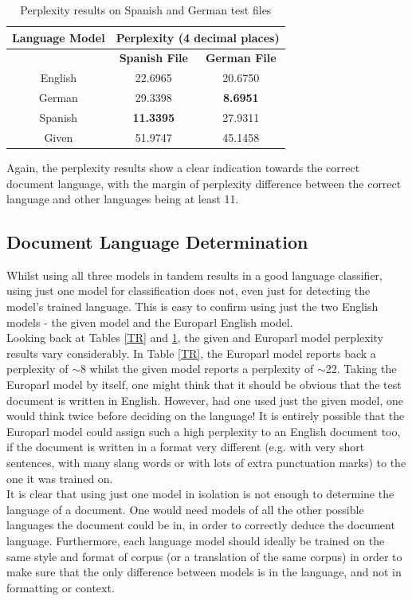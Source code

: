 \documentclass[12pt]{article}
\begin{document}
\begin{table}[H]
	\centering
	\setlength\arrayrulewidth{1pt}
	\caption{\label{SR}Perplexity results on Spanish and German test files }
	\begin{tabular}{c c c}
		\hline
		\textbf{Language Model} & \multicolumn{2}{c}{\textbf{Perplexity (4 decimal places)} }\\
		\hline
		  & \textbf{Spanish File} & \textbf{German File} \\
		\hline                     
		English& 22.6965 & 20.6750\\
		German & 29.3398 & \textbf{8.6951}\\
		Spanish & \textbf{11.3395} & 27.9311\\
		Given & 51.9747& 45.1458\\
	\end{tabular}
\end{table}

Again, the perplexity results show a clear indication towards the correct document language, with the margin of perplexity difference between the correct language and other languages being at least 11. 

\subsection{Document Language Determination}

Whilst using all three models in tandem results in a good language classifier, using just one model for classification does not, even just for detecting the model's trained language.  This is easy to confirm using just the two English models - the given model and the Europarl English model.\\
\hfill\break
Looking back at Tables \ref{TR} and \ref{SR}, the given and Europarl model perplexity results vary considerably.  In Table \ref{TR}, the Europarl model reports back a perplexity of $\sim$8 whilst the given model reports a perplexity of $\sim$22.  Taking the Europarl model by itself, one might think that it should be obvious that the test document is written in English.  However, had one used just the given model, one would think twice before deciding on the language!  It is entirely possible that the Europarl model could assign such a high perplexity to an English document too, if the document is written in a format very different (e.g. with very short sentences, with many slang words or with lots of extra punctuation marks) to the one it was trained on.\\
\hfill\break
It is clear that using just one model in isolation is not enough to determine the language of a document.  One would need models of all the other possible languages the document could be in, in order to correctly deduce the document language.  Furthermore, each language model should ideally be trained on the same style and format of corpus (or a translation of the same corpus) in order to make sure that the only difference between models is in the language, and not in formatting or context.  
\end{document}
